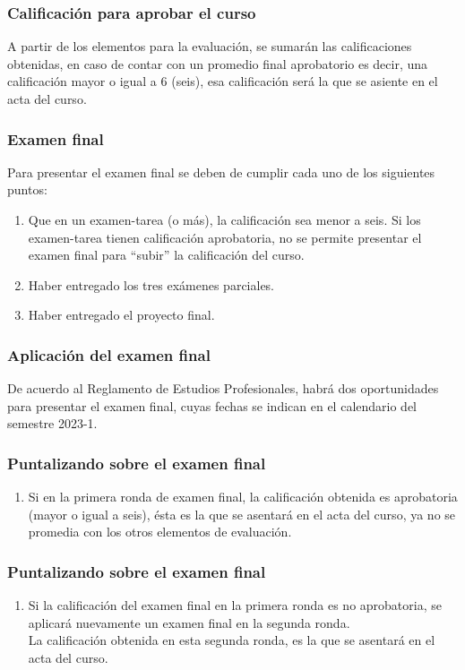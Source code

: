 \documentclass[12pt]{beamer}
\begin{document}
\begin{frame}
\frametitle{Calificación para aprobar el curso}
A partir de los elementos para la evaluación, se sumarán las calificaciones obtenidas, en caso de contar con un promedio final aprobatorio  es decir, una calificación mayor o igual a $6$ (seis), \pause esa calificación será la que se asiente en el acta del curso.
\end{frame}
\begin{frame}
\frametitle{Examen final}
Para presentar el examen final se deben de cumplir cada uno de los siguientes puntos:
\begin{enumerate}[<+->]
\item Que en un examen-tarea (o más), la calificación sea menor a seis. Si los examen-tarea tienen calificación aprobatoria, no se permite presentar el examen final para \enquote{subir} la calificación del curso.
\item Haber entregado los tres exámenes parciales.
\item Haber entregado el proyecto final.
\end{enumerate}
\end{frame}
\begin{frame}
\frametitle{Aplicación del examen final}
De acuerdo al Reglamento de Estudios Profesionales, habrá dos oportunidades para presentar el examen final, cuyas fechas se indican en el calendario del semestre 2023-1.
\end{frame}
\begin{frame}
\frametitle{Puntalizando sobre el examen final}
\begin{enumerate}[<+->]
\item Si en la primera ronda de examen final, la calificación obtenida es aprobatoria (mayor o igual a seis), ésta es la que se asentará en el acta del curso, ya no se promedia con los otros elementos de evaluación.
\seti
\end{enumerate}
\end{frame}
\begin{frame}
\frametitle{Puntalizando sobre el examen final}
\begin{enumerate}[<+->]
\conti    
\item Si la calificación del examen final en la primera ronda es no aprobatoria, se aplicará nuevamente un examen final en la segunda ronda. 
\\
\bigskip
\pause
La calificación obtenida en esta segunda ronda, es la que se asentará en el acta del curso.
\seti
\end{enumerate}
\end{frame}
\end{document}
